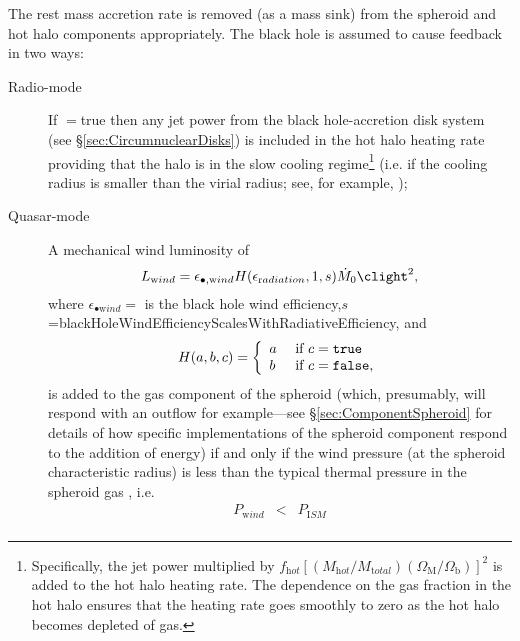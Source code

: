The rest mass accretion rate is removed (as a mass sink) from the spheroid and hot halo components appropriately. The black hole is assumed to cause feedback in two ways:
\begin{description}
 \item [Radio-mode] If {\normalfont \ttfamily [blackHoleHeatsHotHalo]}$=${\normalfont \ttfamily true} then any jet power from the black hole-accretion disk system (see \S\ref{sec:CircumnuclearDisks}) is included in the hot halo heating rate providing that the halo is in the slow cooling regime\footnote{Specifically, the jet power multiplied by $f_{\mathrm hot} [(M_{\mathrm hot}/M_{\mathrm total}) (\Omega_{\mathrm M}/\Omega_{\mathrm b})]^2$ is added to the hot halo heating rate. The dependence on the gas fraction in the hot halo ensures that the heating rate goes smoothly to zero as the hot halo becomes depleted of gas.} (i.e. if the cooling radius is smaller than the virial radius; see, for example, \citealt{benson_cold_2010});
 \item [Quasar-mode] A mechanical wind luminosity of \citep{ostriker_momentum_2010}
\begin{equation}
 L_{\mathrm wind} = \epsilon_{\bullet, {\mathrm wind}} H(\epsilon_{\mathrm radiation},1,s) \dot{M}_0 \clight^2,
\end{equation}
where $\epsilon_{\bullet {\mathrm wind}}=${\normalfont \ttfamily [blackHoleWindEfficiency]} is the black hole wind efficiency,\newline $s$={\normalfont \ttfamily blackHoleWindEfficiencyScalesWithRadiativeEfficiency}, and
\begin{equation}
H(a,b,c) = \left\{\begin{array}{ll}a & \hbox{ if } c=\hbox{\normalfont \ttfamily true} \\b & \hbox{ if } c=\hbox{\normalfont \ttfamily false},\end{array}\right.
\end{equation}
is added to the gas \gls{component} of the spheroid (which, presumably, will respond with an outflow for example---see \S\ref{sec:ComponentSpheroid} for details of how specific implementations of the spheroid component respond to the addition of energy) if and only if the wind pressure (at the spheroid characteristic radius) is less than the typical thermal pressure in the spheroid gas \citep{ciotti_feedbackcentral_2009}, i.e.
\begin{eqnarray}
 P_{\mathrm wind} &<& P_{\mathrm ISM} \nonumber \\

\end{eqnarray}
\end{description}
